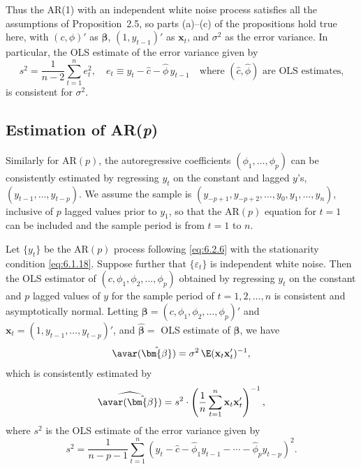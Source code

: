 Thus the AR(1) with an independent white noise process satisfies all the
assumptions of Proposition~2.5, so parts (a)--(c) of the propositions hold true here,
with $(c, \phi)'$ as $\bm{\beta}$, $(1, y_{t-1})'$ as $\mathbf{x}_t$, and $\sigma^2$ as the error variance. In particular, the
OLS estimate of the error variance given by
\[
  s^2 = \frac{1}{n-2} \sum_{t=1}^{n} e_t^2, \quad
  e_t \equiv y_t - \hat{c} - \hat{\phi}\,y_{t-1} \quad
  \text{where $(\hat{c}, \hat{\phi})$ are OLS estimates,}
\]
is consistent for $\sigma^2$.

\subsection*{Estimation of AR(\textit{p})}

Similarly for $\text{AR}(p)$, the autoregressive coefficients $(\phi_1, \ldots, \phi_p)$ can be consistently
estimated by regressing $y_t$ on the constant and lagged $y$'s, $(y_{t-1}, \ldots, y_{t-p})$.
We assume the sample is $(y_{-p+1}, y_{-p+2}, \ldots, y_0, y_1, \ldots, y_n)$, inclusive of $p$ lagged
values prior to $y_1$, so that the $\text{AR}(p)$ equation for $t = 1$ can be included and the
sample period is from $t = 1$ to $n$.

\begin{proposition}
\label{prop:6.7}
Let $\{y_t\}$ be the $\mathrm{AR}(p)$ process
following \eqref{eq:6.2.6} with the stationarity condition \eqref{eq:6.1.18}. Suppose further that
$\{\varepsilon_t\}$ is independent white noise. Then the OLS estimator of $(c, \phi_1, \phi_2, \ldots, \phi_p)$
obtained by regressing $y_t$ on the constant and $p$ lagged values of $y$ for the sample
period of $t = 1, 2, \ldots, n$ is consistent and asymptotically normal. Letting
$\bm{\beta} = (c, \phi_1, \phi_2, \ldots, \phi_p)'$ and $\mathbf{x}_t = (1, y_{t-1}, \ldots, y_{t-p})'$, and $\hat{\bm{\beta}} =$ OLS estimate of
$\bm{\beta}$, we have
\[
  \avar(\hat{\bm{\beta}}) = \sigma^2\,\E(\mathbf{x}_t \mathbf{x}_t')^{-1},
\]
which is consistently estimated by
\[
  \widehat{\avar(\hat{\bm{\beta}})} = s^2 \cdot
  \left(\frac{1}{n} \sum_{t=1}^{n} \mathbf{x}_t \mathbf{x}_t'\right)^{-1},
\]
where $s^2$ is the OLS estimate of the error variance given by
\begin{equation}
  s^2 = \frac{1}{n - p - 1} \sum_{t=1}^{n}
  (y_t - \hat{c} - \hat{\phi}_1 y_{t-1} - \cdots - \hat{\phi}_p y_{t-p})^2.
  \label{eq:6.4.5}
\end{equation}
\end{proposition}


